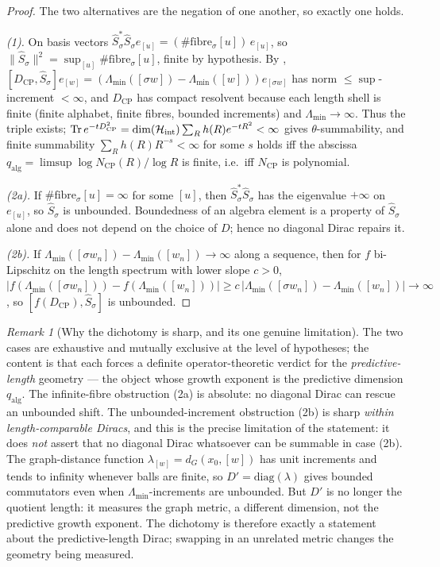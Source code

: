 \documentclass[11pt]{article}
\theoremstyle{definition}
\theoremstyle{remark}
\newtheorem{remark}[theorem]{Remark}
\newcommand{\Hh}{\mathcal{H}}
\newcommand{\CP}{\mathrm{CP}}
\newcommand{\qalg}{q_{\mathrm{alg}}}
\newcommand{\Lam}{\Lambda}
\newcommand{\Tr}{\operatorname{Tr}}
\newcommand{\norm}[1]{\lVert#1\rVert}
\begin{document}
\begin{proof}
The two alternatives are the negation of one another, so exactly one holds.

\emph{(1).}  On basis vectors $\widehat S_\sigma^{*}\widehat S_\sigma e_{[u]}=
(\#\text{fibre}_\sigma[u])\,e_{[u]}$, so $\norm{\widehat S_\sigma}^2=
\sup_{[u]}\#\text{fibre}_\sigma[u]$, finite by hypothesis.  By
, $[D_{\CP},\widehat S_\sigma]e_{[w]}=(\Lam_{\min}([\sigma w])-
\Lam_{\min}([w]))e_{[\sigma w]}$ has norm $\le\sup$-increment $<\infty$, and
$D_{\CP}$ has compact resolvent because each length shell is finite (finite
alphabet, finite fibres, bounded increments) and $\Lam_{\min}\to\infty$.  Thus
the triple exists; $\Tr e^{-tD_{\CP}^2}=\dim(\Hh_{\rm int})\sum_R h(R)e^{-tR^2}<
\infty$ gives $\theta$-summability, and finite summability
$\sum_R h(R)R^{-s}<\infty$ for some $s$ holds iff the abscissa
$\qalg=\limsup\log N_{\CP}(R)/\log R$ is finite, i.e.\ iff $N_{\CP}$ is
polynomial.

\emph{(2a).}  If $\#\text{fibre}_\sigma[u]=\infty$ for some $[u]$, then
$\widehat S_\sigma^{*}\widehat S_\sigma$ has the eigenvalue $+\infty$ on
$e_{[u]}$, so $\widehat S_\sigma$ is unbounded.  Boundedness of an algebra
element is a property of $\widehat S_\sigma$ alone and does not depend on the
choice of $D$; hence no diagonal Dirac repairs it.

\emph{(2b).}  If $\Lam_{\min}([\sigma w_n])-\Lam_{\min}([w_n])\to\infty$ along a
sequence, then for $f$ bi-Lipschitz on the length spectrum with lower slope
$c>0$, $|f(\Lam_{\min}([\sigma w_n]))-f(\Lam_{\min}([w_n]))|\ge c\,
|\Lam_{\min}([\sigma w_n])-\Lam_{\min}([w_n])|\to\infty$, so
$[f(D_{\CP}),\widehat S_\sigma]$ is unbounded.
\end{proof}

\begin{remark}[Why the dichotomy is sharp, and its one genuine limitation]
\label{rem:dichotomy-sharp}
The two cases are exhaustive and mutually exclusive at the level of hypotheses;
the content is that each forces a definite operator-theoretic verdict for the
\emph{predictive-length} geometry --- the object whose growth exponent is the
predictive dimension $\qalg$.  The infinite-fibre obstruction (2a) is absolute:
no diagonal Dirac can rescue an unbounded shift.  The unbounded-increment
obstruction (2b) is sharp \emph{within length-comparable Diracs}, and this is the precise limitation of the statement: it does \emph{not} assert that no diagonal Dirac
whatsoever can be summable in case (2b).  The graph-distance function
$\lambda_{[w]}=d_G(x_0,[w])$ has unit increments and tends to infinity whenever
balls are finite, so $D'=\mathrm{diag}(\lambda)$ gives bounded commutators even
when $\Lam_{\min}$-increments are unbounded.  But $D'$ is no longer the quotient
length: it measures the graph metric, a different dimension, not the predictive
growth exponent.  The dichotomy is therefore exactly a statement about the
predictive-length Dirac; swapping in an unrelated metric changes the geometry
being measured.
\end{remark}
\end{document}
